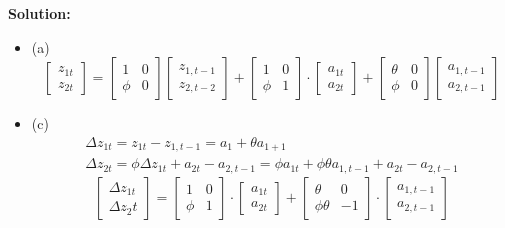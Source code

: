 \documentclass{article}
\begin{document}
\begin{enumerate}
	\textbf{Solution:}
	\begin{itemize}
		\item (a)
		\begin{equation*}
		\left[ \begin{array}{l}z_{1 t} \\ {z_{2 t}}\end{array}\right]=\left[ \begin{array}{ll}{1} & {0} \\ {\phi} & {0}\end{array}\right] \left[ \begin{array}{ll}{z_{1, t-1}} \\ {z_{2, t-2}}\end{array}\right] + \left[ \begin{array}{ll}{1} & {0} \\ {\phi} & {1}\end{array}\right] \cdot \left[ \begin{array}{l}a_{1 t} \\ a_{2 t}\end{array}\right] + \left[ \begin{array}{cc}{\theta} & {0} \\ {\phi} & {0}\end{array}\right] \left[ \begin{array}{ll}a_{1, t-1} \\ a_{2, t-1}\end{array}\right]
		\end{equation*}
		\item (c)
		\begin{equation*}
		\begin{array}{l}
		\Delta z_{1 t}=z_{1 t}-z_{1, t-1}=a_{1}+\theta a_{1+1}\\
		\Delta z_{2 t}=\phi \Delta z_{1 t}+a_{2 t}-a_{2, t-1} = \phi a_{1t} + \phi \theta a_{1,{t-1}} + a_{2t} - a_{2,{t-1}}
		\end{array}
		\end{equation*}
		\begin{equation*}
		\left[ \begin{array}{l}{\Delta z_{1 t}} \\ {\Delta z_{2} t}\end{array}\right]=\left[ \begin{array}{ll}{1} & {0} \\ {\phi} & {1}\end{array}\right] \cdot \left[ \begin{array}{l}{a_{1 t}} \\ a_{2 t}\end{array}\right] + \left[ \begin{array}{ll}{\theta} & {0} \\ {\phi\theta} & {-1}\end{array}\right] \cdot \left[ \begin{array}{l}a_{1, {t-1}} \\ a_{2, {t-1}}\end{array}\right]

\end{equation*}
\end{itemize}
\end{enumerate}
\end{document}
